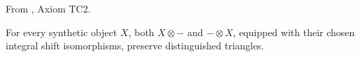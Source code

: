\begin{theorem}
\label{frontier:Literature:1a607d05c555}
From \cite{May01}, Axiom TC2.\par

For every synthetic object $X$, both $X\otimes-$ and $-\otimes X$, equipped with their chosen integral shift isomorphisms, preserve distinguished triangles.
\end{theorem}

